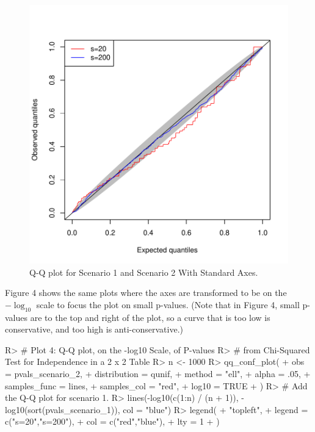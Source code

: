 \documentclass[article]{jss}
\begin{document}
\begin{figure}
\begin{center}
\includegraphics{manuscript-chisq_qq}
\end{center}
\caption{Q-Q plot for Scenario 1 and Scenario 2 With Standard Axes.}
\end{figure}

Figure 4 shows the same plots where the axes are transformed to be on the $-\log_{10}$ scale to focus the plot on small p-values. (Note that in Figure 4, small p-values are to the top and right of the plot, so a curve that is too low is conservative, and too high is anti-conservative.)  

\begin{Schunk}
\begin{Sinput}
R> # Plot 4: Q-Q plot, on the -log10 Scale, of P-values 
R> # from Chi-Squared Test for Independence in a 2 x 2 Table
R> n <- 1000
R> qq_conf_plot(
+    obs = pvals_scenario_2,
+    distribution = qunif,
+    method = "ell",
+    alpha = .05,
+    samples_func = lines,
+    samples_col = "red",
+    log10 = TRUE
+  )
R> # Add the Q-Q plot for scenario 1.
R> lines(-log10(c(1:n) / (n + 1)), -log10(sort(pvals_scenario_1)), col = "blue")
R> legend(
+    "topleft",
+    legend = c("s=20","s=200"), 
+    col = c("red","blue"), 
+    lty = 1
+  )
\end{Sinput}
\end{Schunk}
\end{document}
